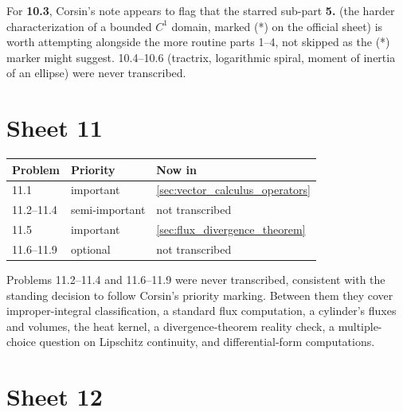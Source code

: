 \begin{ainote}
For \textbf{10.3}, Corsin's note  appears to flag that the starred sub-part
\textbf{5.} (the harder  characterization of a bounded $C^1$ domain, marked
(*) on the official sheet) is worth attempting alongside the more routine parts 1--4, not
skipped as the (*) marker might suggest. 10.4--10.6 (tractrix, logarithmic spiral, moment of
inertia of an ellipse) were never transcribed.
\end{ainote}

\section{Sheet 11}
\label{sec:sheet_index_11}

\begin{center}
\begin{tabular}{@{}l l l@{}}
\textbf{Problem} & \textbf{Priority} & \textbf{Now in} \\
\hline
11.1 & important & \cref{sec:vector_calculus_operators} \\[3pt]
11.2--11.4 & semi-important & not transcribed \\[3pt]
11.5 & important & \cref{sec:flux_divergence_theorem} \\[3pt]
11.6--11.9 & optional & not transcribed \\
\end{tabular}
\end{center}

\begin{ainote}
Problems 11.2--11.4 and 11.6--11.9 were never transcribed, consistent with the standing
decision to follow Corsin's priority marking. Between them they cover improper-integral
classification, a standard flux computation, a cylinder's fluxes and volumes, the heat kernel,
a divergence-theorem reality check, a multiple-choice question on Lipschitz continuity, and
differential-form computations.
\end{ainote}

\section{Sheet 12}
\label{sec:sheet_index_12}

